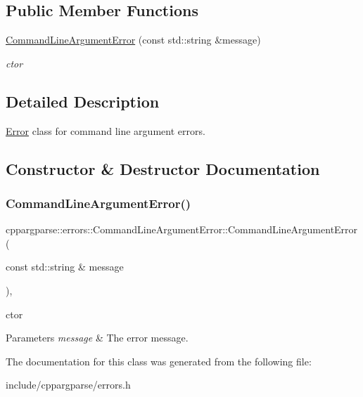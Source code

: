 \subsection*{Public Member Functions}
\begin{DoxyCompactItemize}
\item 
\hyperlink{classcppargparse_1_1errors_1_1CommandLineArgumentError_acb14010d573ba078332a149d2ebf3be6}{Command\+Line\+Argument\+Error} (const std\+::string \&message)
\begin{DoxyCompactList}\small\item\em c\textquotesingle{}tor \end{DoxyCompactList}\end{DoxyCompactItemize}


\subsection{Detailed Description}
\hyperlink{classcppargparse_1_1errors_1_1Error}{Error} class for command line argument errors. 

\subsection{Constructor \& Destructor Documentation}
\mbox{\label{classcppargparse_1_1errors_1_1CommandLineArgumentError_acb14010d573ba078332a149d2ebf3be6}} 
\subsubsection{\texorpdfstring{Command\+Line\+Argument\+Error()}{CommandLineArgumentError()}}
{\footnotesize\ttfamily cppargparse\+::errors\+::\+Command\+Line\+Argument\+Error\+::\+Command\+Line\+Argument\+Error (\begin{DoxyParamCaption}\item[{const std\+::string \&}]{message }\end{DoxyParamCaption})\hspace{0.3cm}{\ttfamily [inline]}, {\ttfamily [explicit]}}



c\textquotesingle{}tor 


\begin{DoxyParams}{Parameters}
{\em message} & The error message. \\
\hline
\end{DoxyParams}


The documentation for this class was generated from the following file\+:\begin{DoxyCompactItemize}
\item 
include/cppargparse/errors.\+h\end{DoxyCompactItemize}

